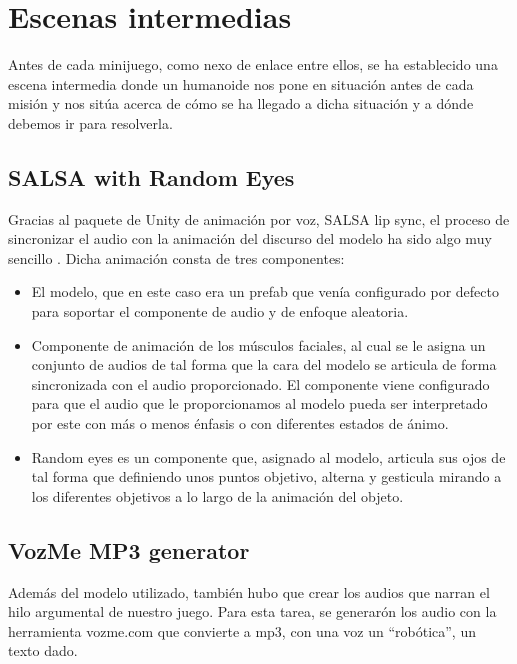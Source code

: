 \section{Escenas intermedias}
\label{cap4:sec:intermedias}

Antes de cada minijuego, como nexo de enlace entre ellos, se ha establecido una escena intermedia donde un humanoide nos pone en situación antes de cada misión y nos sitúa acerca de cómo se ha llegado a dicha situación y a dónde debemos ir para resolverla.

\subsection{SALSA with Random Eyes}
\label{cap4:sub:salsa}

Gracias al paquete de Unity de animación por voz, SALSA lip sync, el proceso de sincronizar el audio con la animación del discurso del modelo ha sido algo muy sencillo \cite{salsa}. Dicha animación consta de tres componentes:

\begin{itemize}
\item{El modelo, que en este caso era un prefab que venía configurado por defecto para soportar el componente de audio y de enfoque aleatoria.}

\item{Componente de animación de los músculos faciales, al cual se le asigna un conjunto de audios de tal forma que la cara del modelo se articula de forma sincronizada con el audio proporcionado. El componente viene configurado para que el audio que le proporcionamos al modelo pueda ser interpretado por este con más o menos énfasis o con diferentes estados de ánimo.}

\item{Random eyes es un componente que, asignado al modelo, articula sus ojos de tal forma que definiendo unos puntos objetivo, alterna y gesticula mirando a los diferentes objetivos a lo largo de la animación del objeto.}
\end{itemize}

\subsection{VozMe MP3 generator}
\label{cap4:sub:vozme}

Además del modelo utilizado, también hubo que crear los audios que narran el hilo argumental de nuestro juego. Para esta tarea, se generarón los audio con la herramienta vozme.com \cite{vozme} que convierte a mp3, con una voz un ``robótica'', un texto dado.

